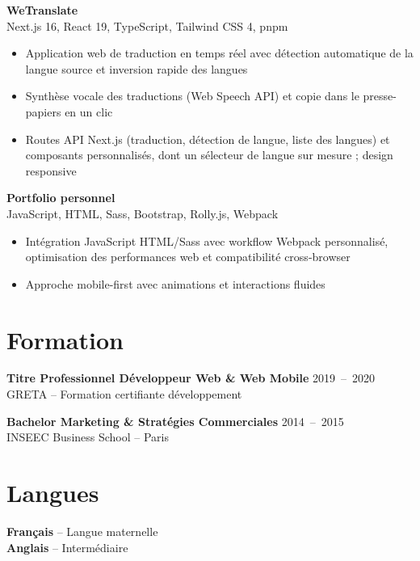 \documentclass[9pt,a4paper]{extarticle}
\newcommand{\secgap}{\vspace{0.8em}}
\newcommand{\entry}[3]{%
  \vspace{0.25em}%
  {\bfseries #1} \hfill {\color{grey}\footnotesize\mbox{#2}}\\[-1pt]
  {\color{accent}\footnotesize #3}\par\vspace{0.1em}%
}
\begin{document}
\begin{minipage}[t]{0.488\textwidth}
\entry{WeTranslate}{}{Next.js 16, React 19, TypeScript, Tailwind CSS 4, pnpm}
\begin{itemize}
  \item Application web de traduction en temps réel avec détection automatique de la langue source et inversion rapide des langues
  \item Synthèse vocale des traductions (Web Speech API) et copie dans le presse-papiers en un clic
  \item Routes API Next.js (traduction, détection de langue, liste des langues) et composants personnalisés, dont un sélecteur de langue sur mesure ; design responsive
\end{itemize}

\entry{Portfolio personnel}{}{JavaScript, HTML, Sass, Bootstrap, Rolly.js, Webpack}
\begin{itemize}
  \item Intégration JavaScript HTML/Sass avec workflow Webpack personnalisé, optimisation des performances web et compatibilité cross-browser
  \item Approche mobile-first avec animations et interactions fluides
\end{itemize}

\secgap
\section{Formation}
\entry{Titre Professionnel Développeur Web \& Web Mobile}{2019 -- 2020}{GRETA -- Formation certifiante développement}
\entry{Bachelor Marketing \& Stratégies Commerciales}{2014 -- 2015}{INSEEC Business School -- Paris}

\secgap
\section{Langues}
\textbf{Français} -- Langue maternelle\\
\textbf{Anglais} -- Intermédiaire
\end{minipage}
\end{document}
